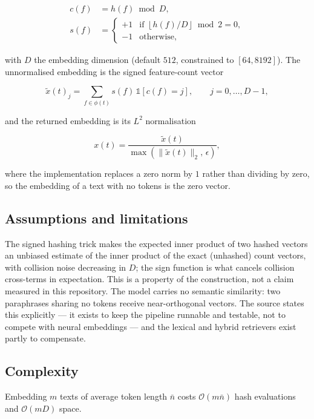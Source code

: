 \begin{align}
c(f) &= h(f) \bmod D, \\
s(f) &= \begin{cases}
  +1 & \text{if } \left\lfloor h(f)/D \right\rfloor \bmod 2 = 0,\\
  -1 & \text{otherwise,}
\end{cases}
\end{align}

with $D$ the embedding dimension (default $512$, constrained to $[64, 8192]$).
The unnormalised embedding is the signed feature-count vector

\begin{equation}
\tilde{x}(t)_j = \sum_{f \in \phi(t)} s(f)\,\mathbb{1}\!\left[c(f) = j\right],
\qquad j = 0,\dots,D-1,
\end{equation}

and the returned embedding is its $L^2$ normalisation

\begin{equation}
x(t) = \frac{\tilde{x}(t)}{\max\left(\lVert \tilde{x}(t) \rVert_2,\, \epsilon\right)},
\end{equation}

where the implementation replaces a zero norm by $1$ rather than dividing by
zero, so the embedding of a text with no tokens is the zero vector.

\subsection*{Assumptions and limitations}

The signed hashing trick makes the expected inner product of two hashed vectors
an unbiased estimate of the inner product of the exact (unhashed) count
vectors, with collision noise decreasing in $D$; the sign function is what
cancels collision cross-terms in expectation. This is a property of the
construction, not a claim measured in this repository. The model carries no
semantic similarity: two paraphrases sharing no tokens receive near-orthogonal
vectors. The source states this explicitly --- it exists to keep the pipeline
runnable and testable, not to compete with neural embeddings --- and the
lexical and hybrid retrievers exist partly to compensate.

\subsection*{Complexity}

Embedding $m$ texts of average token length $\bar{n}$ costs
$\mathcal{O}(m\bar{n})$ hash evaluations and $\mathcal{O}(mD)$ space.

